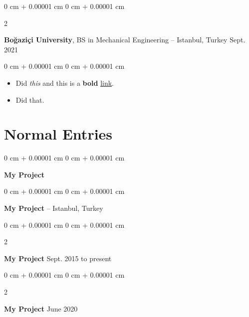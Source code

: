\documentclass[10pt, letterpaper]{article}
\newenvironment{highlights}{
    \begin{itemize}[
        topsep=0.10 cm,
        parsep=0.10 cm,
        partopsep=0pt,
        itemsep=0pt,
        leftmargin=0 cm + 10pt
    ]
}{
    \end{itemize}
        
    \vspace{-0.10cm}
} %
\newenvironment{onecolentry}{
    \begin{adjustwidth}{
        0 cm + 0.00001 cm
    }{
        0 cm + 0.00001 cm
    }
}{
    \end{adjustwidth}
} %
\newenvironment{twocolentry}[2][]{
    \onecolentry
    \def\secondColumn{#2}
    \setcolumnwidth{\fill, 4.1 cm}
    \begin{paracol}{2}
}{
    \switchcolumn \raggedleft \secondColumn
    \end{paracol}
    \endonecolentry
} %
\begin{document}
        \begin{twocolentry}{
            Sept. 2021
        }
            \textbf{Boğaziçi University}, BS in Mechanical Engineering -- Istanbul, Turkey\end{twocolentry}

        \vspace{0.10 cm}
        \begin{onecolentry}
            \begin{highlights}
                \item Did \textit{this} and this is a \textbf{bold} \href{https://example.com}{link}.
                \item Did that.
            \end{highlights}
        \end{onecolentry}



    
    \section{Normal Entries}

        
        \begin{onecolentry}
            \textbf{My Project}\end{onecolentry}

        \vspace{0.10 cm}


        \vspace{0.15 cm}

        \begin{onecolentry}
            \textbf{My Project} -- Istanbul, Turkey\end{onecolentry}

        \vspace{0.10 cm}


        \vspace{0.15 cm}

        \begin{twocolentry}{
            Sept. 2015 to present
        }
            \textbf{My Project}\end{twocolentry}

        \vspace{0.10 cm}


        \vspace{0.15 cm}

        \begin{twocolentry}{
            June 2020
        }
            \textbf{My Project}\end{twocolentry}
\end{document}
